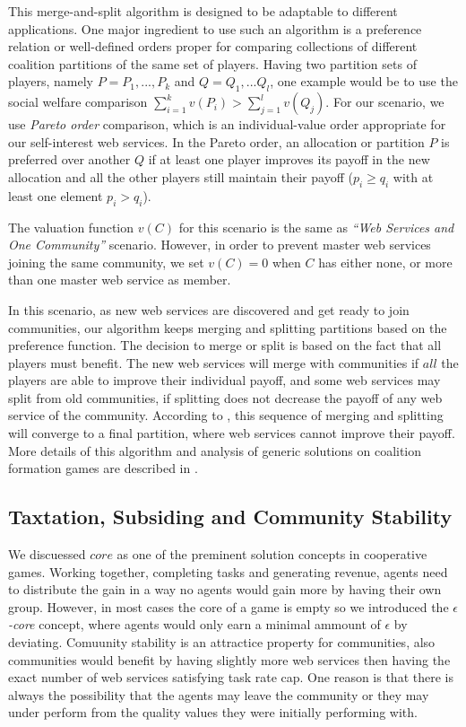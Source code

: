This merge-and-split algorithm is designed to be adaptable to
different applications. One major ingredient to use such an
algorithm is a preference relation or well-defined orders proper
for comparing collections of different coalition partitions of the
same set of players. Having two partition sets of players, namely
$P = {P_1,...,P_k}$ and $Q = {Q_1,...Q_l}$, one example would be
to use the social welfare comparison $\sum^k_{i=1}v(P_i) >
\sum^l_{j=1}v(Q_j)$. For our scenario, we use \emph{Pareto order}
comparison, which is an individual-value order appropriate for our
self-interest web services. In the Pareto order, an allocation or
partition $P$ is preferred over another $Q$ if at least one player
improves its payoff in the new allocation and all the other
players still maintain their payoff ($p_i \geq q_i$ with at least
one element $p_i > q_i$).

The valuation function $v(C)$ for this scenario is the same as
\emph{``Web Services and One Community''} scenario. However, in
order to prevent master web services joining the same community,
we set $v(C) = 0$ when $C$ has either none, or more than one
master web service as member.

In this scenario, as new web services are discovered and get ready
to join communities, our algorithm keeps merging and splitting
partitions based on the preference function. The decision to merge
or split is based on the fact that all players must benefit. The
new web services will merge with communities if $all$ the players
are able to improve their individual payoff, and some web services
may split from old communities, if splitting does not decrease the
payoff of any web service of the community. According to
\cite{DBLP:journals/corr/abs-cs-0605132}, this sequence of merging
and splitting will converge to a final partition, where web
services cannot improve their payoff. More details of this
algorithm and analysis of generic solutions on coalition formation
games are described in \cite{DBLP:journals/igtr/AptW09}.

\subsection{Taxtation, Subsiding and Community Stability}\label{s:tax}

We discuessed $core$ as one of the preminent solution concepts in cooperative games. Working together, completing tasks and generating revenue, agents need to distribute the gain in a way no agents would gain more by having their own group. However, in most cases the core of a game is empty so we introduced the \emph{$\epsilon$-core} concept, where agents would only earn a minimal ammount of $\epsilon$ by deviating. Comuunity stability is an attractice property for communities, also communities would benefit by having slightly more web services then having the exact number of web services satisfying task rate cap. One reason is that there is always the possibility that the agents may leave the community or they may under perform from the quality values they were initially performing with.

